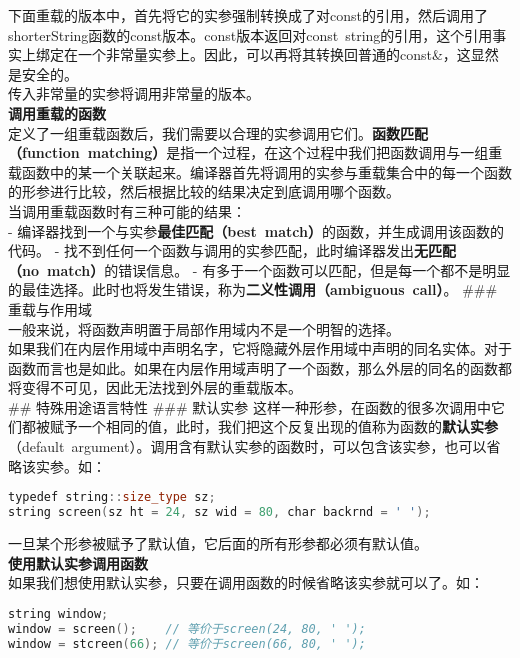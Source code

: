 \documentclass[
  a4paper,
  oneside,tablecaptionabove
]{scrbook}
\begin{document}
下面重载的版本中，首先将它的实参强制转换成了对const的引用，然后调用了shorterString函数的const版本。const版本返回对const~string的引用，这个引用事实上绑定在一个非常量实参上。因此，可以再将其转换回普通的const\&，这显然是安全的。\\
传入非常量的实参将调用非常量的版本。\\
\textbf{调用重载的函数}\\
定义了一组重载函数后，我们需要以合理的实参调用它们。\textbf{函数匹配（function~matching）}是指一个过程，在这个过程中我们把函数调用与一组重载函数中的某一个关联起来。编译器首先将调用的实参与重载集合中的每一个函数的形参进行比较，然后根据比较的结果决定到底调用哪个函数。\\
当调用重载函数时有三种可能的结果：\\
-
编译器找到一个与实参\textbf{最佳匹配（best~match）}的函数，并生成调用该函数的代码。
-
找不到任何一个函数与调用的实参匹配，此时编译器发出\textbf{无匹配（no~match）}的错误信息。
-
有多于一个函数可以匹配，但是每一个都不是明显的最佳选择。此时也将发生错误，称为\textbf{二义性调用（ambiguous~call）}。
\#\#\# 重载与作用域\\
一般来说，将函数声明置于局部作用域内不是一个明智的选择。\\
如果我们在内层作用域中声明名字，它将隐藏外层作用域中声明的同名实体。对于函数而言也是如此。如果在内层作用域声明了一个函数，那么外层的同名的函数都将变得不可见，因此无法找到外层的重载版本。\\
\#\# 特殊用途语言特性 \#\#\# 默认实参
这样一种形参，在函数的很多次调用中它们都被赋予一个相同的值，此时，我们把这个反复出现的值称为函数的\textbf{默认实参}（default~argument）。调用含有默认实参的函数时，可以包含该实参，也可以省略该实参。如：

\begin{lstlisting}[language={C++}]
typedef string::size_type sz;
string screen(sz ht = 24, sz wid = 80, char backrnd = ' ');
\end{lstlisting}

一旦某个形参被赋予了默认值，它后面的所有形参都必须有默认值。\\
\textbf{使用默认实参调用函数}\\
如果我们想使用默认实参，只要在调用函数的时候省略该实参就可以了。如：

\begin{lstlisting}[language={C++}]
string window;
window = screen();    // 等价于screen(24, 80, ' ');
window = stcreen(66); // 等价于screen(66, 80, ' ');
\end{lstlisting}
\end{document}
